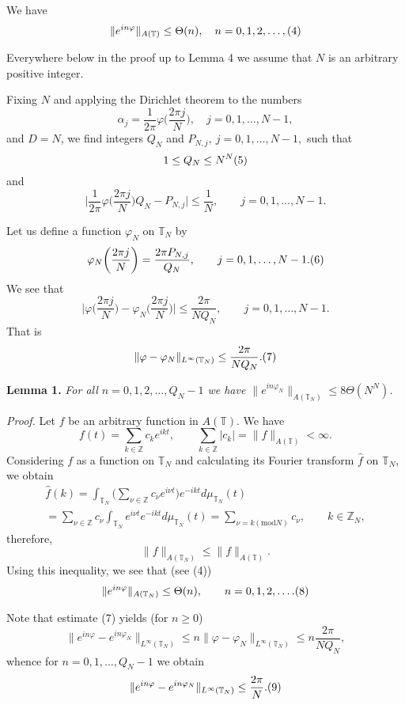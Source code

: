 \documentclass[12pt]{article}
\begin{document}
    We have
$$
\|e^{in\varphi}\|_{A(\mathbb T)}\leq \Theta(n),
\quad n=0, 1, 2, \ldots,
\relax(4)
$$

  Everywhere below in the proof up to Lemma 4 we assume that
$N$ is an arbitrary positive integer.

  Fixing $N$ and applying the Dirichlet theorem to the numbers
$$
\alpha_j=\frac{1}{2\pi}\varphi\bigg(\frac{2\pi j}{N}\bigg),
\quad j=0, 1, \ldots, N-1,
$$
and $D=N$, we find integers $Q_N$ and $P_{N, j}, ~j=0, 1, \ldots,
N-1,$ such that
$$
1\leq Q_N\leq N^N
\relax(5)
$$
and
$$
\bigg|\frac{1}{2\pi}\varphi\bigg(\frac{2\pi j}{N}\bigg)Q_N-P_{N, j}\bigg|
\leq\frac{1}{N}, \qquad j=0, 1, \ldots, N-1.
$$

   Let us define a function $\varphi_N$ on $\mathbb T_N$ by
$$
\varphi_N\bigg(\frac{2\pi j}{N}\bigg)=\frac{2\pi P_{N, j}}{Q_N},
\qquad j=0, 1, \ldots, N-1.
\relax(6)
$$
We see that
$$
\bigg|\varphi\bigg(\frac{2\pi j}{N}\bigg)-
\varphi_N\bigg(\frac{2\pi j}{N}\bigg)\bigg|\leq\frac{2\pi}{NQ_N},
\qquad j=0, 1, \ldots, N-1.
$$
That is
$$
\|\varphi-\varphi_N\|_{L^\infty(\mathbb T_N)}\leq\frac{2\pi}{NQ_N}.
\relax(7)
$$

\quad

\textbf{Lemma 1.} \emph{For all $n=0,1,2, \ldots, Q_N-1$ we have
$\|e^{in\varphi_N}\|_{A(\mathbb T_N)}\leq 8 \Theta(N^N)$.}

\quad

\emph{Proof.} Let $f$ be an arbitrary function in $A(\mathbb T)$.
We have
$$
f(t)=\sum_{k\in\mathbb Z}c_k e^{ikt},
\qquad \sum_{k\in\mathbb Z} |c_k|=\|f\|_{A(\mathbb T)}<\infty.
$$
Considering $f$ as a function on $\mathbb T_N$ and calculating its
Fourier transform $\widehat{f}$ on $\mathbb T_N$, we obtain
\begin{multline*}
\widehat{f}(k)= \int_{\mathbb T_N}\bigg(\sum_{\nu\in\mathbb Z}
c_\nu e^{i\nu t}\bigg)e^{-ikt} d\mu_{\mathbb T_N}(t)\\=
\sum_{\nu\in\mathbb Z}c_\nu\int_{\mathbb T_N}e^{i\nu t}e^{-ikt}
d\mu_{\mathbb T_N}(t)=\sum_{\nu=k(\mathrm{mod} N)}c_\nu, \qquad
k\in\mathbb Z_N,
\end{multline*}
therefore,
$$
\|f\|_{A(\mathbb T_N)}\leq\|f\|_{A(\mathbb T)}.
$$
Using this inequality, we see that (see (4))
$$
\|e^{in\varphi}\|_{A(\mathbb T_N)}\leq \Theta(n),
\qquad n=0, 1, 2, \ldots.
\relax(8)
$$

  Note that estimate (7) yields (for $n\geq 0$)
$$
\|e^{in\varphi}-e^{in\varphi_N}\|_{L^\infty(\mathbb T_N)}
\leq n\|\varphi-\varphi_N\|_{L^\infty(\mathbb T_N)}
\leq n\frac{2\pi}{NQ_N},
$$
whence for $n=0, 1, \ldots, Q_N-1$ we obtain
$$
\|e^{in\varphi}-e^{in\varphi_N}\|_{L^\infty(\mathbb T_N)}
\leq\frac{2\pi}{N}.
\relax(9)
$$
\end{document}

